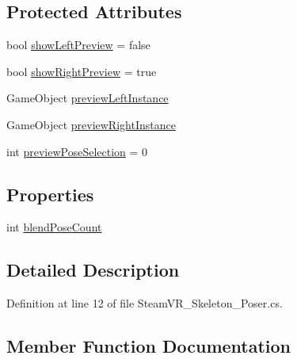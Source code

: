 \subsection*{Protected Attributes}
\begin{DoxyCompactItemize}
\item 
bool \mbox{\hyperlink{class_valve_1_1_v_r_1_1_steam_v_r___skeleton___poser_a099b2bc09cf978f79a755cfa0b3bdf62}{show\+Left\+Preview}} = false
\item 
bool \mbox{\hyperlink{class_valve_1_1_v_r_1_1_steam_v_r___skeleton___poser_a92205c4f05ff19407be88cb0fb360ef5}{show\+Right\+Preview}} = true
\item 
Game\+Object \mbox{\hyperlink{class_valve_1_1_v_r_1_1_steam_v_r___skeleton___poser_af6bb854d4b8b8b42cea424a8d5f7c643}{preview\+Left\+Instance}}
\item 
Game\+Object \mbox{\hyperlink{class_valve_1_1_v_r_1_1_steam_v_r___skeleton___poser_a74ec43e56444959bd3de102cf5c844d8}{preview\+Right\+Instance}}
\item 
int \mbox{\hyperlink{class_valve_1_1_v_r_1_1_steam_v_r___skeleton___poser_a734a92a17b0539f34e3b46d5437c1faf}{preview\+Pose\+Selection}} = 0
\end{DoxyCompactItemize}
\subsection*{Properties}
\begin{DoxyCompactItemize}
\item 
int \mbox{\hyperlink{class_valve_1_1_v_r_1_1_steam_v_r___skeleton___poser_a5d7fc3c60a7e5204c951779ca781c39e}{blend\+Pose\+Count}}
\end{DoxyCompactItemize}


\subsection{Detailed Description}


Definition at line 12 of file Steam\+V\+R\+\_\+\+Skeleton\+\_\+\+Poser.\+cs.



\subsection{Member Function Documentation}
\mbox{\label{class_valve_1_1_v_r_1_1_steam_v_r___skeleton___poser_a70b791c62e9028d464a30cd48bdc79b8}} 
